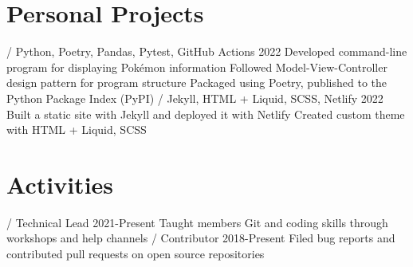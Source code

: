 \section{Personal Projects}
\begin{doutline}
    \1[Pokésummary] / Python, Poetry, Pandas, Pytest, GitHub Actions \hfill 2022
        \2 Developed command-line program for displaying Pokémon information
        \2 Followed Model-View-Controller design pattern for program structure
        \2 Packaged using Poetry, published to the Python Package Index (PyPI)
     / Jekyll, HTML + Liquid, SCSS, Netlify \hfill 2022
        \2 Built a static site with Jekyll and deployed it with Netlify
        \2 Created custom theme with HTML + Liquid, SCSS
\end{doutline}

\section{Activities}
\begin{doutline}
     / Technical Lead \hfill 2021-Present
        \2 Taught members Git and coding skills through workshops and help channels
     / Contributor \hfill 2018-Present
        \2 Filed bug reports and contributed pull requests on open source repositories
\end{doutline}
